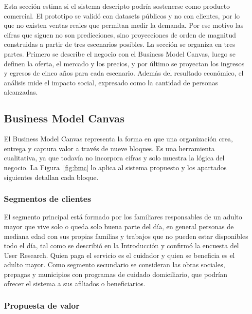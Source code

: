Esta sección estima si el sistema descripto podría sostenerse como producto comercial.
El prototipo se validó con datasets públicos y no con clientes, por lo que no existen ventas reales que permitan medir la demanda.
Por ese motivo las cifras que siguen no son predicciones, sino proyecciones de orden de magnitud construidas a partir de tres escenarios posibles.
La sección se organiza en tres partes.
Primero se describe el negocio con el Business Model Canvas, luego se definen la oferta, el mercado y los precios, y por último se proyectan los ingresos y egresos de cinco años para cada escenario.
Además del resultado económico, el análisis mide el impacto social, expresado como la cantidad de personas alcanzadas.

\subsection{Business Model Canvas}
\label{sec:bmc}

El Business Model Canvas \parencite{Osterwalder2010} representa la forma en que una organización crea, entrega y captura valor a través de nueve bloques.
Es una herramienta cualitativa, ya que todavía no incorpora cifras y solo muestra la lógica del negocio.
La Figura~\ref{fig:bmc} lo aplica al sistema propuesto y los apartados siguientes detallan cada bloque.


\subsubsection{Segmentos de clientes}

El segmento principal está formado por los familiares responsables de un adulto mayor que vive solo o queda solo buena parte del día, en general personas de mediana edad con sus propias familias y trabajos que no pueden estar disponibles todo el día, tal como se describió en la Introducción y confirmó la encuesta del User Research.
Quien paga el servicio es el cuidador y quien se beneficia es el adulto mayor.
Como segmento secundario se consideran las obras sociales, prepagas y municipios con programas de cuidado domiciliario, que podrían ofrecer el sistema a sus afiliados o beneficiarios.

\subsubsection{Propuesta de valor}

